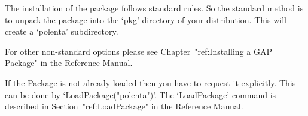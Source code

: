 
\null

The installation of the {\Polenta} package follows standard {\GAP} rules.
So the standard method is to unpack	 the package into the `pkg'
directory  of your {\GAP} distribution.  This will create a `polenta'
subdirectory. 

For other non-standard options please see  Chapter~"ref:Installing a
GAP Package" in the {\GAP} Reference Manual.


\null

If the {\Polenta} Package is not already loaded 
then you have to request it explicitly. 
This  can be 
done by `LoadPackage("polenta")'.
The `LoadPackage' command is described in Section~"ref:LoadPackage"
in the {\GAP} Reference Manual.




